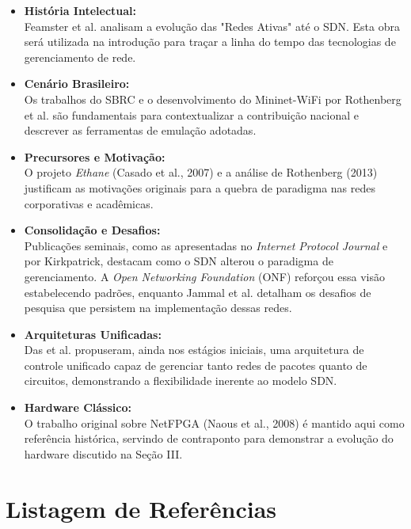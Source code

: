\documentclass[10pt]{IEEEtran}
\begin{document}
\begin{itemize}
    \item \cite{Feamster:RoadToSDN} \textbf{História Intelectual:} \\
    Feamster et al. analisam a evolução das "Redes Ativas" até o SDN. Esta obra será utilizada na introdução para traçar a linha do tempo das tecnologias de gerenciamento de rede.
    
    \item \cite{Guedes:SBRC2012, Rothenberg:MininetWiFi} \textbf{Cenário Brasileiro:} \\
    Os trabalhos do SBRC e o desenvolvimento do Mininet-WiFi por Rothenberg et al. são fundamentais para contextualizar a contribuição nacional e descrever as ferramentas de emulação adotadas.
    
    \item \cite{Casado:Ethane, Rothenberg:OpenFlow} \textbf{Precursores e Motivação:} \\
    O projeto \textit{Ethane} (Casado et al., 2007) e a análise de Rothenberg (2013) justificam as motivações originais para a quebra de paradigma nas redes corporativas e acadêmicas.
    
    \item \cite{Jammal:SDNChallenges, Kirkpatrick2013, IPJ_16_1, 6587999} \textbf{Consolidação e Desafios:} \\
    Publicações seminais, como as apresentadas no \textit{Internet Protocol Journal} e por Kirkpatrick, destacam como o SDN alterou o paradigma de gerenciamento. A \textit{Open Networking Foundation} (ONF) reforçou essa visão estabelecendo padrões, enquanto Jammal et al. detalham os desafios de pesquisa que persistem na implementação dessas redes.

    \item \cite{Das:10} \textbf{Arquiteturas Unificadas:} \\
    Das et al. propuseram, ainda nos estágios iniciais, uma arquitetura de controle unificado capaz de gerenciar tanto redes de pacotes quanto de circuitos, demonstrando a flexibilidade inerente ao modelo SDN.
    
    \item \cite{10.1145/1477942.1477944} \textbf{Hardware Clássico:} \\
    O trabalho original sobre NetFPGA (Naous et al., 2008) é mantido aqui como referência histórica, servindo de contraponto para demonstrar a evolução do hardware discutido na Seção III.
\end{itemize}

\section{Listagem de Referências}
\nocite{*} 

\printbibliography[category=basica, title={Bibliografia Básica (Obras Canônicas)}]
\printbibliography[category=hardware, title={Hardware Avançado: FPGA, Analógico e Fotônica}]
\printbibliography[category=tendencias, title={Tendências: P4 e Evolução de Software}]
\printbibliography[category=contexto, title={Contexto: Histórico e Regional}]
\end{document}
